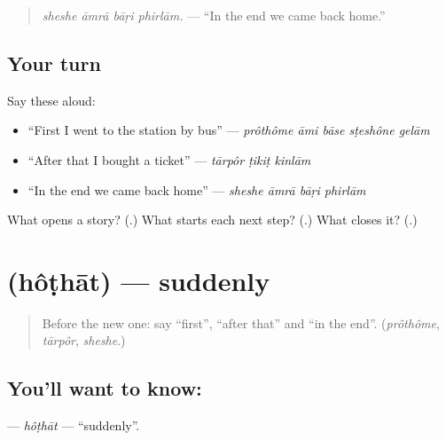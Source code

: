 \begin{quote}
\textbf{   }
\end{quote}

\begin{quote}
\emph{sheshe āmrā bāṛi phirlām.} — \textquotedblleft{}In the end we came back home.\textquotedblright{}
\end{quote}

\subsection*{Your turn}
Say these aloud:

\begin{itemize}
\raggedright
  \item \textquotedblleft{}First I went to the station by bus\textquotedblright{} — \emph{prôthôme āmi bāse sṭeshône gelām}
  \item \textquotedblleft{}After that I bought a ticket\textquotedblright{} — \emph{tārpôr ṭikiṭ kinlām}
  \item \textquotedblleft{}In the end we came back home\textquotedblright{} — \emph{sheshe āmrā bāṛi phirlām}
\end{itemize}

\begin{tcolorbox}[breakable,colback=teal!4,colframe=teal!35!black,title={Before you move on}]
What opens a story? (\textbf{}.) What starts each next step? (\textbf{}.) What closes it? (\textbf{}.)
\end{tcolorbox}
\section[\texorpdfstring{\bn{হঠাৎ} (hôṭhāt)}{হঠাৎ (hôṭhāt)}]{ (hôṭhāt) — suddenly}

\label{lesson:BN-C267-hothat}



\begin{quote}
Before the new one: say \textquotedblleft{}first\textquotedblright{}, \textquotedblleft{}after that\textquotedblright{} and \textquotedblleft{}in the end\textquotedblright{}. (\emph{prôthôme}, \emph{tārpôr}, \emph{sheshe}.)
\end{quote}

\subsection*{You'll want to know: }
\textbf{} — \emph{hôṭhāt} — \textquotedblleft{}suddenly\textquotedblright{}.

